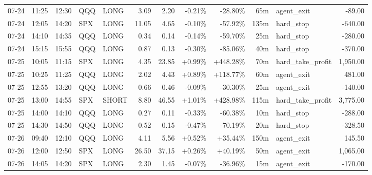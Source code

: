 \documentclass[11pt,a4paper,twoside]{article}
\begin{document}
\begin{center}
\begin{longtable}{>{\color{txtmain}}l l l l l r r r r r >{\color{txtmain}}l r}
07-24 & 11:25 & 12:30 & QQQ & LONG & 3.09 & 2.20 & \textcolor{lossred}{-0.21\%} & \textcolor{lossred}{-28.80\%} & 65m & agent\_exit & \textcolor{lossred}{-89.00} \\
07-24 & 12:05 & 14:20 & SPX & LONG & 11.05 & 4.65 & \textcolor{lossred}{-0.10\%} & \textcolor{lossred}{-57.92\%} & 135m & hard\_stop & \textcolor{lossred}{-640.00} \\
07-24 & 14:10 & 14:35 & QQQ & LONG & 0.34 & 0.14 & \textcolor{lossred}{-0.14\%} & \textcolor{lossred}{-59.70\%} & 25m & hard\_stop & \textcolor{lossred}{-280.00} \\
07-24 & 15:15 & 15:55 & QQQ & LONG & 0.87 & 0.13 & \textcolor{lossred}{-0.30\%} & \textcolor{lossred}{-85.06\%} & 40m & hard\_stop & \textcolor{lossred}{-370.00} \\
07-25 & 10:05 & 11:15 & SPX & LONG & 4.35 & 23.85 & \textcolor{wingreen}{+0.99\%} & \textcolor{wingreen}{+448.28\%} & 70m & hard\_take\_profit & \textcolor{wingreen}{1,950.00} \\
07-25 & 10:25 & 11:25 & QQQ & LONG & 2.02 & 4.43 & \textcolor{wingreen}{+0.89\%} & \textcolor{wingreen}{+118.77\%} & 60m & agent\_exit & \textcolor{wingreen}{481.00} \\
07-25 & 12:55 & 13:20 & QQQ & LONG & 0.66 & 0.46 & \textcolor{lossred}{-0.09\%} & \textcolor{lossred}{-30.30\%} & 25m & agent\_exit & \textcolor{lossred}{-140.00} \\
07-25 & 13:00 & 14:55 & SPX & SHORT & 8.80 & 46.55 & \textcolor{wingreen}{+1.01\%} & \textcolor{wingreen}{+428.98\%} & 115m & hard\_take\_profit & \textcolor{wingreen}{3,775.00} \\
07-25 & 14:00 & 14:10 & QQQ & LONG & 0.27 & 0.11 & \textcolor{lossred}{-0.33\%} & \textcolor{lossred}{-60.38\%} & 10m & hard\_stop & \textcolor{lossred}{-288.00} \\
07-25 & 14:30 & 14:50 & QQQ & LONG & 0.52 & 0.15 & \textcolor{lossred}{-0.47\%} & \textcolor{lossred}{-70.19\%} & 20m & hard\_stop & \textcolor{lossred}{-328.50} \\
07-26 & 09:40 & 12:10 & QQQ & LONG & 4.11 & 5.56 & \textcolor{wingreen}{+0.52\%} & \textcolor{wingreen}{+35.44\%} & 150m & agent\_exit & \textcolor{wingreen}{145.50} \\
07-26 & 12:00 & 12:50 & SPX & LONG & 26.50 & 37.15 & \textcolor{wingreen}{+0.26\%} & \textcolor{wingreen}{+40.19\%} & 50m & agent\_exit & \textcolor{wingreen}{1,065.00} \\
07-26 & 14:05 & 14:20 & SPX & LONG & 2.30 & 1.45 & \textcolor{lossred}{-0.07\%} & \textcolor{lossred}{-36.96\%} & 15m & agent\_exit & \textcolor{lossred}{-170.00} \\

\end{longtable}
\end{center}
\end{document}
